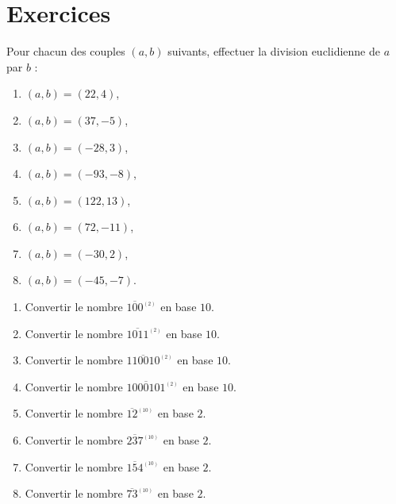\TCDLessonStyleOff
\clearpage
\providecommand{\congru}[3]{#1 \equiv #2 \quad \mathrm{mod}\ #3}
\providecommand{\base}[2]{\overline{#1}^{_{(#2)}}} %
\section{Exercices}
%
\begin{exo}
	Pour chacun des couples $(a,b)$ suivants, effectuer la division euclidienne de $a$ par $b$ :
		\begin{enumerate}
			\item $(a,b) = (22,4)$,
			\item $(a,b) = (37,-5)$,
			\item $(a,b) = (-28,3)$,
			\item $(a,b) = (-93,-8)$,
			\item $(a,b) = (122,13)$,
			\item $(a,b) = (72,-11)$,
			\item $(a,b) = (-30,2)$,
			\item $(a,b) = (-45,-7)$.
		\end{enumerate}
\end{exo}
%
\begin{exo}
	\begin{enumerate}
		\item Convertir le nombre $\base{100}{2}$ en base $ 10 $.
		\item Convertir le nombre $\base{1011}{2}$ en base $ 10 $.
		\item Convertir le nombre $\base{110010}{2}$ en base $ 10 $.
		\item Convertir le nombre $\base{1000101}{2}$ en base $ 10 $.
		\item Convertir le nombre $\base{12}{10}$ en base $ 2 $.
		\item Convertir le nombre $\base{237}{10}$ en base $ 2 $.
		\item Convertir le nombre $\base{154}{10}$ en base $ 2 $.
		\item Convertir le nombre $\base{73}{10}$ en base $ 2 $.
	\end{enumerate}
\end{exo}
%
